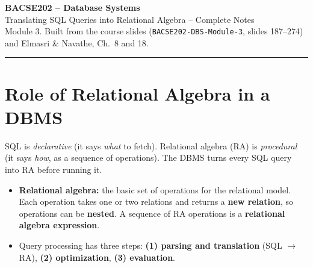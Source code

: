 \documentclass[10pt,a4paper]{article}
\begin{document}
\begin{center}
{\LARGE\bfseries BACSE202 -- Database Systems}\\[3pt]
{\Large Translating SQL Queries into Relational Algebra -- Complete Notes}\\[3pt]
{\small Module 3. Built from the course slides (\texttt{BACSE202-DBS-Module-3}, slides 187--274) and Elmasri \& Navathe, Ch.~8 and 18.}
\end{center}

\tableofcontents
\vspace{4pt}\hrule

\section{Role of Relational Algebra in a DBMS}

SQL is \emph{declarative} (it says \emph{what} to fetch). Relational algebra (RA) is \emph{procedural} (it says \emph{how}, as a sequence of operations). The DBMS turns every SQL query into RA before running it.

\begin{center}
\end{center}

\begin{itemize}
  \item \textbf{Relational algebra:} the basic set of operations for the relational model. Each operation takes one or two relations and returns a \textbf{new relation}, so operations can be \textbf{nested}. A sequence of RA operations is a \textbf{relational algebra expression}.
  \item Query processing has three steps: \textbf{(1) parsing and translation} (SQL $\to$ RA), \textbf{(2) optimization}, \textbf{(3) evaluation}.
\end{itemize}
\end{document}
